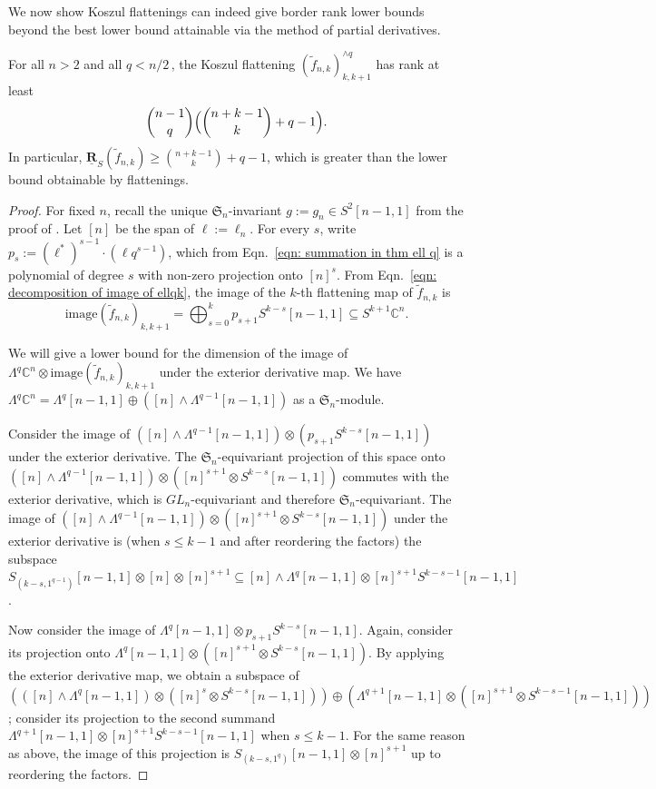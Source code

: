 \documentclass{toc}
\newcommand{\bbC}{\mathbb{C}}
\newcommand{\frakS}{\mathfrak{S}}
\renewcommand{\tilde}[1]{\widetilde{#1}}
\def\ww{\wedge}
\def\La#1{\Lambda^{#1}}
\def\tim{\mathrm{image}}
\def\ur{\underline {\mathbf R}}
\begin{document}
We now show Koszul flattenings can indeed give border rank lower bounds beyond the best lower bound attainable via the method of partial derivatives. 

\begin{proposition}\label{fknkosz}  For all $n > 2$ and all $q < {n}/{2}$\,, the Koszul flattening $(\tilde f_{n,k})_{k,k+1}^{\ww q}$ has rank at least
$$
\binom{n-1}q \Bigl(\binom{n+k-1}{k} +  q-1   \Bigr).
$$
In particular, $\ur_S(\tilde f_{n,k})\geq \binom{n+k-1}{k} +q-1$, which is greater than the lower bound obtainable by flattenings.
\end{proposition} 
\begin{proof}
  For fixed $n$, recall the unique $\frakS_n$-invariant $g := g_n \in S^2 [n-1,1]$ from the proof of . Let $[n]$ be the span of $\ell:= \ell_n$.  For every $s$, write $p_s := (\ell^*)^{s-1} \cdot (\ell q^{s-1})$,  which from Eqn.~\eqref{eqn: summation in thm ell q} is a polynomial of degree $s$ with non-zero projection onto $[n]^s$. {}From Eqn.~\eqref{eqn: decomposition of image of ellqk}, the image of the $k$-th flattening map of $\tilde{f}_{n,k}$ is
  \[
    \tim (\tilde{f}_{n,k})_{k,k+1} = \bigoplus_{s=0}^k p_{s+1}S^{k-s}[n-1,1] \subseteq S^{k+1} \bbC^n.
    \]

We will give a lower bound for the dimension of the image of $ \Lambda^q \bbC^n \otimes \tim (\tilde{f}_{n,k})_{k,k+1}$ under the exterior
derivative map. We have $\Lambda^q \bbC^n = \Lambda^{q} [n-1,1] \oplus \left( [n] \wedge \Lambda^{q-1} [n-1,1] \right)$ as a $\frakS_n$-module.

Consider the image of $( [n]\ww \La{q-1}[n-1,1]) \otimes (p_{s+1}S^{k-s}[n-1,1])$ under the exterior derivative. The $\frakS_n$-equivariant projection of this space onto $( [n]\ww \La{q-1}[n-1,1]) \otimes ([n]^{s+1} \otimes S^{k-s}[n-1,1])$ commutes with the exterior derivative, which is $GL_n$-equivariant and therefore $\frakS_n$-equivariant. The image of $( [n]\ww \La{q-1}[n-1,1]) \otimes ([n]^{s+1} \otimes S^{k-s}[n-1,1])$ under the exterior derivative is (when $s\leq k-1$ and after reordering the factors) the subspace $S_{(k-s,1^{q-1})}[n-1,1]\otimes [n]\otimes [n]^{s+1} \subseteq [n]\ww \La q[n-1,1]\otimes [n]^{s+1}S^{k-s-1}[n-1,1]$.

Now consider the image of $\La{q }[n-1,1] \otimes p_{s+1}S^{k-s}[n-1,1]$. Again, consider its projection onto $\Lambda^q [n-1,1] \otimes ([n]^{s+1} \otimes S^{k-s}[n-1,1])$. By applying the exterior derivative map, we obtain a subspace of $\left(([n] \wedge \Lambda^q [n-1,1]) \otimes ([n]^{s} \otimes S^{k-s} [n-1,1])\right)\oplus  \left(\La{q+1}[n-1,1]\otimes ([n]^{s+1} \otimes S^{k-s-1}[n-1,1] )\right)$; consider its projection to the second summand $  \La {q+1}[n-1,1]\otimes [n]^{s+1}S^{k-s-1}[n-1,1]$ when $s\leq k-1$. For the same reason as above,  the image of this projection is $S_{(k-s,1^{q })}[n-1,1]\otimes [n]^{s+1}$ up to reordering the factors.


\end{proof}
\end{document}
